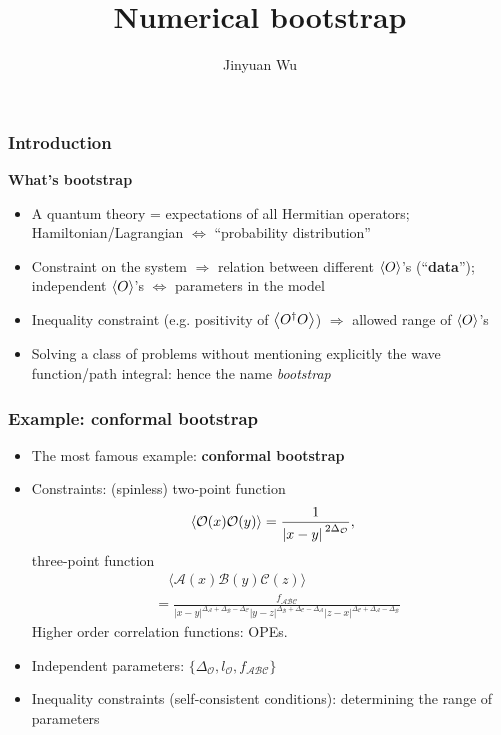 \documentclass{beamer}
\title{Numerical bootstrap}
\author{Jinyuan Wu}
\institute{Department of Physics, Fudan University}
\newcommand{\concept}[1]{\textbf{#1}}
\begin{document}
\frame{\titlepage}

\begin{frame}
\frametitle{Introduction}

\textbf{What's bootstrap}

\begin{itemize}
    \item A quantum theory = expectations of all Hermitian operators; 
    Hamiltonian/Lagrangian $\Leftrightarrow$ ``probability distribution''
    \item Constraint on the system $\Rightarrow$ relation between different $\expval{O}$'s (``\concept{data}'');
    independent $\expval{O}$'s $\Leftrightarrow$ parameters in the model
    \item Inequality constraint (e.g. positivity of $\expval{O^\dagger O}$) $\Rightarrow$ allowed 
    range of $\expval{O}$'s
    \item Solving a class of problems without mentioning explicitly the wave function/path integral: 
    hence the name \emph{bootstrap}
\end{itemize}

\vspace{1em}

\end{frame}

\begin{frame}
\frametitle{Example: conformal bootstrap}

\begin{itemize}
    \item The most famous example: \concept{conformal bootstrap}
    \item Constraints: (spinless) two-point function 
    \begin{equation}
        \expval*{\mathcal{O}(x) \mathcal{O}(y)} = \frac{1}{\abs*{x - y}^{2 \Delta_\mathcal{O}}},
    \end{equation}
    three-point function 
    \begin{equation}
        \begin{aligned}
            &\quad \langle\mathcal{A}(x) \mathcal{B}(y) \mathcal{C}(z)\rangle \\
            &= \frac{f_{\mathcal{A B C}}}{|x-y|^{\Delta_{\mathcal{A}}+\Delta_{\mathcal{B}}-\Delta_{\mathcal{C}}}|y-z|^{\Delta_{\mathcal{B}}+\Delta_{\mathcal{C}}-\Delta_{\mathcal{A}}}|z-x|^{\Delta_{\mathcal{C}}+\Delta_{\mathcal{A}}-\Delta_{\mathcal{B}}}}
        \end{aligned}
    \end{equation}
    Higher order correlation functions: OPEs. 
    \item Independent parameters: $\{\Delta_{\mathcal{O}}, l_{\mathcal{O}}, f_{\mathcal{A} \mathcal{B} \mathcal{C}}\}$
    \item Inequality constraints (self-consistent conditions): determining the range of parameters
\end{itemize}

\end{frame}
\end{document}
